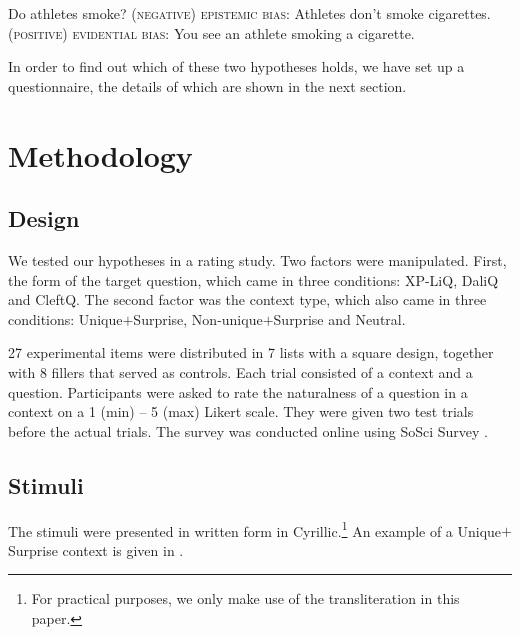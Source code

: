 \documentclass[output=paper,
colorlinks,
citecolor=brown,
newtxmath
]{langscibook}
\begin{document}

\ea
\ea Do athletes smoke?
\ex \textsc{(negative) epistemic bias}: Athletes don't smoke cigarettes.
\ex \textsc{(positive) evidential bias}: You see an athlete smoking a cigarette.
\z \label{smoke} \z

\noindent
In order to find out which of these two hypotheses holds, we have set up a questionnaire, the details of which are shown in the next section.
\section{Methodology}\label{sec:method}

\subsection{Design}
We tested our hypotheses in a rating study. Two factors were manipulated. First, the form of the target question, which came in three conditions: XP-LiQ, DaliQ and CleftQ. The second factor was the context type, which also came in three conditions: Unique$+$Surprise, Non-unique$+$Surprise and Neutral.

27 experimental items were distributed in 7 lists with a  square design, together with 8 fillers that served as controls. Each trial consisted of a context and a question.
Participants were asked to rate the naturalness of a question in a context on a 1 (min) -- 5 (max) Likert scale. They were given two test trials before the actual trials. The survey was conducted online using SoSci Survey \citep{leiner2014}.


 \subsection{Stimuli}
 The stimuli were presented in written form in  Cyrillic.\footnote{For practical purposes, we only make use of the  transliteration in this paper.} An example of a Unique$+$Surprise context is given in .

\end{document}

